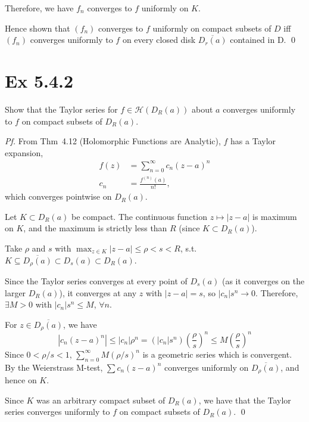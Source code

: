 \documentclass[a4paper]{article}
\newcommand{\Hol}{\mathcal{H}}
\begin{document}
Therefore, we have $f_n$ converges to $f$ uniformly on $K$. 

\medskip
Hence shown that $(f_n)$ converges to $f$ uniformly on compact subsets of $D$ iff $(f_n)$ converges uniformly to $f$ on every closed disk $\overline{D_{r}(a)}$ contained in D. \qed

\newpage
\section*{Ex 5.4.2}

\begin{tcolorbox}[colback=gray!10, colframe=black, boxrule=0.5pt, arc=2mm]
Show that the Taylor series for $f \in \Hol(D_R(a))$ about $a$ converges uniformly to
$f$ on compact subsets of $D_R(a)$.
\end{tcolorbox}

\textit{Pf.} From Thm~4.12 (Holomorphic Functions are Analytic), $f$ has a Taylor expansion,
\begin{align*}
f(z) &= \sum_{n=0}^{\infty} c_n (z-a)^n \\
c_n &= \frac{f^{(n)}(a)}{n!},
\end{align*}
which converges pointwise on $D_R(a)$.

\medskip
Let $K \subset D_R(a)$ be compact. The continuous function $z \mapsto |z-a|$ is
maximum on $K$, and the maximum is strictly less than $R$ (since $K \subset D_R(a)$).

Take $\rho$ and $s$ with $\max_{z \in K} |z-a| \leq \rho < s < R$, s.t.
$K \subseteq \overline{D_\rho(a)} \subset D_s(a) \subset D_R(a)$.

Since the Taylor series converges at every point of $D_s(a)$ (as it converges on the larger
$D_R(a)$), it converges at any $z$ with $|z-a| = s$, so $|c_n| s^n \to 0$.
Therefore, $\exists M > 0$ with $|c_n| s^n \leq M$, $\forall n$.

\medskip
For $z \in \overline{D_\rho(a)}$, we have
\[
|c_n (z-a)^n| \leq |c_n|\rho^n = (|c_n| s^n)\left(\frac{\rho}{s}\right)^n \leq M\left(\frac{\rho}{s}\right)^n
\]
Since $0 < \rho/s < 1$, $\sum_{n=0}^\infty M (\rho/s)^n$ is a geometric series which is convergent. By the Weierstrass M-test, $\sum c_n (z-a)^n$ converges uniformly on
$\overline{D_\rho(a)}$, and hence on $K$.

\medskip
Since $K$ was an arbitrary compact subset of $D_R(a)$, we have that the Taylor series converges
uniformly to $f$ on compact subsets of $D_R(a)$. \qed
\end{document}
